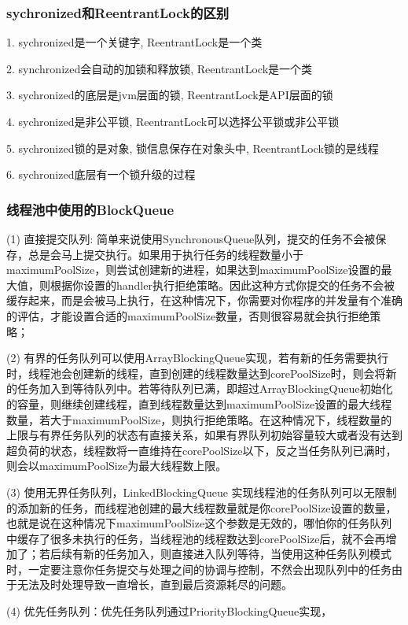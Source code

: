 \documentclass[UTF8]{ctexart}
\begin{document}
\subsubsection{sychronized和ReentrantLock的区别}
1. sychronized是一个关键字, ReentrantLock是一个类 \par
2. synchronized会自动的加锁和释放锁, ReentrantLock是一个类 \par
3. sychronized的底层是jvm层面的锁, ReentrantLock是API层面的锁 \par
4. sychronized是非公平锁, ReentrantLock可以选择公平锁或非公平锁 \par
5. sychronized锁的是对象, 锁信息保存在对象头中, ReentrantLock锁的是线程 \par
6. sychronized底层有一个锁升级的过程 \par
\subsubsection{线程池中使用的BlockQueue} 
(1) 直接提交队列: 简单来说使用SynchronousQueue队列，提交的任务不会被保存，总是会马上提交执行。如果用于执行任务的线程数量小于maximumPoolSize，则尝试创建新的进程，如果达到maximumPoolSize设置的最大值，则根据你设置的handler执行拒绝策略。因此这种方式你提交的任务不会被缓存起来，而是会被马上执行，在这种情况下，你需要对你程序的并发量有个准确的评估，才能设置合适的maximumPoolSize数量，否则很容易就会执行拒绝策略；\par
(2) 有界的任务队列可以使用ArrayBlockingQueue实现，若有新的任务需要执行时，线程池会创建新的线程，直到创建的线程数量达到corePoolSize时，则会将新的任务加入到等待队列中。若等待队列已满，即超过ArrayBlockingQueue初始化的容量，则继续创建线程，直到线程数量达到maximumPoolSize设置的最大线程数量，若大于maximumPoolSize，则执行拒绝策略。在这种情况下，线程数量的上限与有界任务队列的状态有直接关系，如果有界队列初始容量较大或者没有达到超负荷的状态，线程数将一直维持在corePoolSize以下，反之当任务队列已满时，则会以maximumPoolSize为最大线程数上限。\par
(3) 使用无界任务队列，LinkedBlockingQueue 实现线程池的任务队列可以无限制的添加新的任务，而线程池创建的最大线程数量就是你corePoolSize设置的数量，也就是说在这种情况下maximumPoolSize这个参数是无效的，哪怕你的任务队列中缓存了很多未执行的任务，当线程池的线程数达到corePoolSize后，就不会再增加了；若后续有新的任务加入，则直接进入队列等待，当使用这种任务队列模式时，一定要注意你任务提交与处理之间的协调与控制，不然会出现队列中的任务由于无法及时处理导致一直增长，直到最后资源耗尽的问题。 \par
(4) 优先任务队列：优先任务队列通过PriorityBlockingQueue实现，
\end{document}
